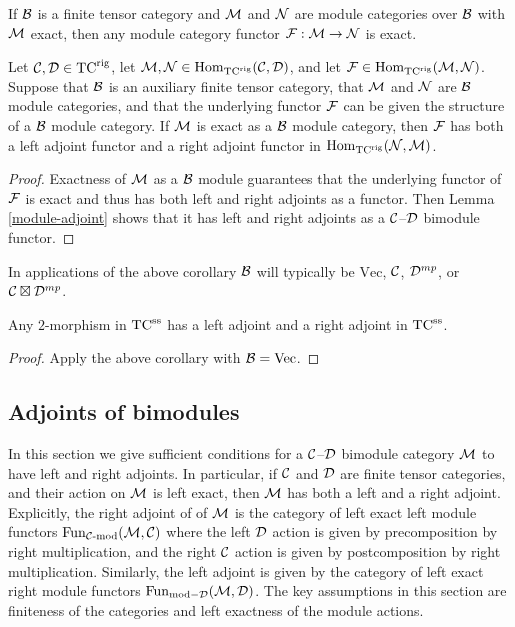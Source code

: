 \documentclass{amsart}
\begin{document}
\begin{proposition}
If $\mathcal B$ is a finite tensor category and $\mathcal M$ and $\mathcal N$ are module categories over $\mathcal B$ with $\mathcal M$ exact, then any module category functor $\mathcal F:\mathcal M \rightarrow \mathcal N$ is exact.
\end{proposition}

\begin{corollary}
Let $\mathcal C, \mathcal D \in {\mathrm{TC}^{\text{rig}}}$, let $\mathcal M, \mathcal N \in \operatorname{Hom}_{\mathrm{TC}^{\text{rig}}}(\mathcal C,\mathcal D)$, and let $\mathcal F \in \operatorname{Hom}_{{\mathrm{TC}^{\text{rig}}}}(\mathcal M,\mathcal N)$.  Suppose that $\mathcal B$ is an auxiliary finite tensor category, that $\mathcal M$ and $\mathcal N$ are $\mathcal B$ module categories, and that the underlying functor $\mathcal F$ can be given the structure of a $\mathcal B$ module category.  If $\mathcal M$ is exact as a $\mathcal B$ module category, then $\mathcal F$ has both a left adjoint functor and a right adjoint functor in $\operatorname{Hom}_{{\mathrm{TC}^{\text{rig}}}}(\mathcal N,\mathcal M)$.  
\end{corollary}
\begin{proof}
Exactness of $\mathcal M$ as a $\mathcal B$ module guarantees that the underlying functor of $\mathcal F$ is exact and thus has both left and right adjoints as a functor.  Then Lemma \ref{module-adjoint} shows that it has left and right adjoints as a $\mathcal C$--$\mathcal D$ bimodule functor.
\end{proof}

\begin{remark}
In applications of the above corollary $\mathcal B$ will typically be $\mathrm{Vec}$, $\mathcal C$, $\mathcal D^{mp}$, or $\mathcal C \boxtimes \mathcal D^{mp}$.
\end{remark}

\begin{corollary}
Any $2$-morphism in ${\mathrm{TC}^{\text{ss}}}$ has a left adjoint and a right adjoint in ${\mathrm{TC}^{\text{ss}}}$.
\end{corollary}
\begin{proof}
Apply the above corollary with $\mathcal B = \mathrm{Vec}$.
\end{proof}

\subsection{Adjoints of bimodules}  \label{sec-df-modules}

In this section we give sufficient conditions for a $\mathcal C$--$\mathcal D$ bimodule category $\mathcal M$ to have left and right adjoints.  In particular, if $\mathcal C$ and $\mathcal D$ are finite tensor categories, and their action on $\mathcal M$ is left exact, then $\mathcal M$ has both a left and a right adjoint.  Explicitly, the right adjoint of of $\mathcal M$ is the category of left exact left module functors $\operatorname{Fun}_{\mathcal C\text{-mod}}(\mathcal M, \mathcal C)$ where the left $\mathcal D$ action is given by precomposition by right multiplication, and the right $\mathcal C$ action is given by postcomposition by right multiplication.  Similarly, the left adjoint is given by the category of left exact right module functors $\operatorname{Fun}_{\text{mod}-\mathcal D}(\mathcal M, \mathcal D)$.  The key assumptions in this section are finiteness of the categories and left exactness of the module actions.
\end{document}
